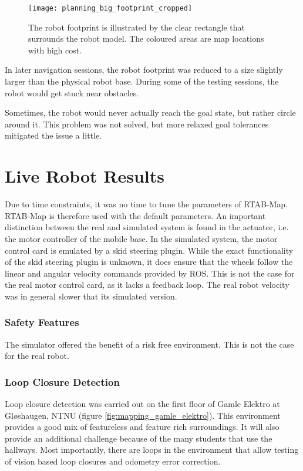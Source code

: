 \begin{figure}[h]
	\centering
	\texttt{[image: planning\_big\_footprint\_cropped]}
	\caption{The robot footprint is illustrated by the clear rectangle that surrounds the robot model. The coloured areas are map locations with high cost. }
	\label{fig:big_footprint}
\end{figure}

In later navigation sessions, the robot footprint was reduced to a size slightly larger than the physical robot base. During some of the testing sessions, the robot would get stuck near obstacles. 

Sometimes, the robot would never actually reach the goal state, but rather circle around it. This problem was not solved, but more relaxed goal tolerances mitigated the issue a little. 

\section{Live Robot Results}

Due to time constraints, it was no time to tune the parameters of \ac{RTAB-Map}. \ac{RTAB-Map} is therefore used with the default parameters. An important distinction between the real and simulated system is found in the actuator, i.e. the motor controller of the mobile base. In the simulated system, the motor control card is emulated by a skid steering plugin. While the exact functionality of the skid steering plugin is unknown, it does ensure that the wheels follow the linear and angular velocity commands provided by \ac{ROS}. This is not the case for the real motor control card, as it lacks a feedback loop. The real robot velocity was in general slower that its simulated version.

\subsubsection{Safety Features}

The simulator offered the benefit of a risk free environment. This is not the case for the real robot. 

\subsubsection{Loop Closure Detection}

Loop closure detection was carried out on the first floor of Gamle Elektro at Gløshaugen, NTNU (figure \ref{fig:mapping_gamle_elektro}). This environment provides a good mix of featureless and feature rich surroundings. It will also provide an additional challenge because of the many students that use the hallways. Most importantly, there are loops in the environment that allow testing of vision based loop closures and odometry error correction. 


